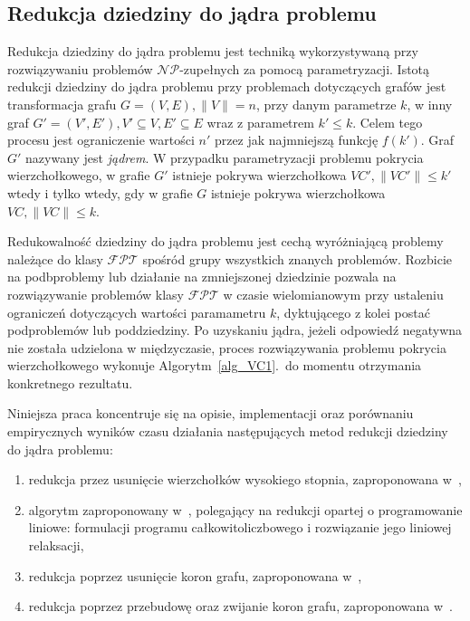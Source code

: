 \subsection{Redukcja dziedziny do jądra problemu}\label{subsection_kernelization}
\par{
  Redukcja dziedziny do jądra problemu jest techniką wykorzystywaną przy
  rozwiązywaniu problemów $\mathcal{NP}$-zupełnych za pomocą parametryzacji.
  Istotą redukcji dziedziny do jądra problemu przy problemach dotyczących grafów
  jest transformacja grafu $G=(V,E), \|V\|=n$, przy danym parametrze $k$, w inny
  graf $G\prime=(V\prime, E\prime), V\prime \subseteq V, E\prime \subseteq E$
  wraz z parametrem $k\prime \leq k$.
  Celem tego procesu jest ograniczenie wartości $n\prime$ przez jak najmniejszą
  funkcję $f(k\prime)$.
  Graf $G\prime$ nazywany jest \emph{jądrem}.
  W przypadku parametryzacji problemu pokrycia wierzchołkowego, w grafie
  $G\prime$ istnieje pokrywa wierzchołkowa $VC\prime, \|VC\prime\|\leq k\prime$ 
  wtedy i tylko wtedy, gdy w grafie $G$ istnieje pokrywa wierzchołkowa $VC,
  \|VC\| \leq k$.
}
\par{
  Redukowalność dziedziny do jądra problemu jest cechą wyróżniającą problemy 
  należące do klasy $\mathcal{FPT}$ spośród grupy wszystkich znanych problemów.
  Rozbicie na podbproblemy lub działanie na zmniejszonej dziedzinie pozwala na
  rozwiązywanie problemów klasy $\mathcal{FPT}$ w czasie wielomianowym przy
  ustaleniu ograniczeń dotyczących wartości paramametru $k$, dyktującego z kolei
  postać podproblemów lub poddziedziny.
  Po uzyskaniu jądra, jeżeli odpowiedź negatywna nie została udzielona w
  międzyczasie, proces rozwiązywania problemu pokrycia wierzchołkowego
  wykonuje Algorytm~\ref{alg_VC1}.\ do momentu otrzymania konkretnego
  rezultatu.
}
\par{
  Niniejsza praca koncentruje się na opisie, implementacji oraz porównaniu
  empirycznych wyników czasu działania następujących metod redukcji dziedziny do
  jądra problemu:
  \begin{enumerate}
    \item redukcja przez usunięcie wierzchołków wysokiego stopnia, zaproponowana
      w~\cite{KernelizationAlgorithms04},
    \item algorytm zaproponowany w~\cite{KernelizationAlgorithms04}, polegający
      na redukcji opartej o programowanie liniowe: formulacji programu
      całkowitoliczbowego i rozwiązanie jego liniowej relaksacji,
    \item redukcja poprzez usunięcie koron grafu, zaproponowana
      w~\cite{abukhzam03},
    \item redukcja poprzez przebudowę oraz zwijanie koron grafu, zaproponowana
      w~\cite{ImprovedBounds10}.
  \end{enumerate}
}
